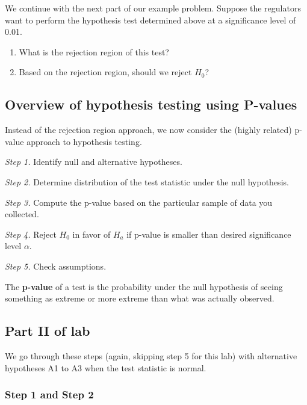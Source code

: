 \documentclass[]{article}
\begin{document}
We continue with the next part of our example problem. Suppose the
regulators want to perform the hypothesis test determined above at a
significance level of 0.01.

\begin{enumerate}
\def\labelenumi{\alph{enumi})}
\setcounter{enumi}{2}
\item
  What is the rejection region of this test?
\item
  Based on the rejection region, should we reject \(H_0\)?
\end{enumerate}

\hypertarget{overview-of-hypothesis-testing-using-p-values}{%
\subsection{Overview of hypothesis testing using
P-values}\label{overview-of-hypothesis-testing-using-p-values}}

Instead of the rejection region approach, we now consider the (highly
related) p-value approach to hypothesis testing.

\emph{Step 1.} Identify null and alternative hypotheses.

\emph{Step 2.} Determine distribution of the test statistic under the
null hypothesis.

\emph{Step 3.} Compute the p-value based on the particular sample of
data you collected.

\emph{Step 4.} Reject \(H_0\) in favor of \(H_a\) if p-value is smaller
than desired significance level \(\alpha\).

\emph{Step 5.} Check assumptions.

The \textbf{p-value} of a test is the probability under the null
hypothesis of seeing something as extreme or more extreme than what was
actually observed.

\hypertarget{part-ii-of-lab}{%
\subsection{Part II of lab}\label{part-ii-of-lab}}

We go through these steps (again, skipping step 5 for this lab) with
alternative hypotheses A1 to A3 when the test statistic is normal.

\hypertarget{step-1-and-step-2}{%
\subsubsection{Step 1 and Step 2}\label{step-1-and-step-2}}
\end{document}
